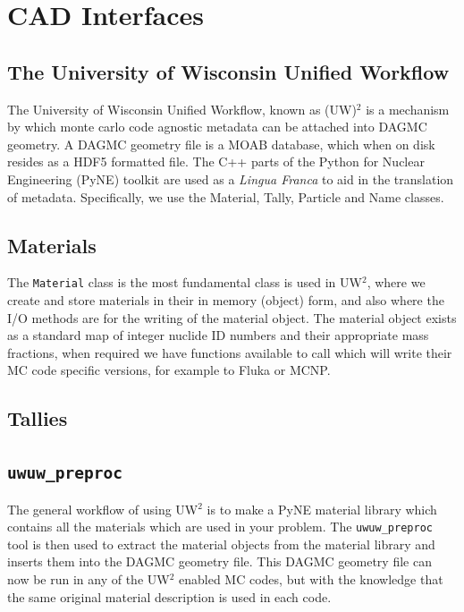 \clearpage
\section{CAD Interfaces}

\subsection{The University of Wisconsin Unified Workflow}
The University of Wisconsin Unified Workflow, known as (UW)$^2$ is a mechanism by which 
monte carlo code agnostic metadata can be attached into DAGMC geometry. A DAGMC geometry
file is a MOAB database, which when on disk resides as a HDF5 formatted file. The C++
parts of the Python for Nuclear Engineering (PyNE) toolkit are used as a \textit{Lingua Franca}
to aid in the translation of metadata. Specifically, we use the Material, Tally, Particle 
and Name classes.
\subsection{Materials}
The \texttt{Material} class is the most fundamental class is used in UW$^2$, where we create and store
materials in their in memory (object) form, and also where the I/O methods are for the writing 
of the material object. The material object exists as a standard map of integer nuclide ID numbers
and their appropriate mass fractions, when required we have functions available to call which will
write their MC code specific versions, for example to Fluka or MCNP. 
\subsection{Tallies}
\subsection{\texttt{uwuw\_preproc}}
The general workflow of using UW$^2$ is to make a PyNE material library which contains all the materials
which are used in your problem. The \texttt{uwuw\_preproc} tool is then used to extract the material 
objects from the material library and inserts them into the DAGMC geometry file. This DAGMC geometry
file can now be run in any of the UW$^2$ enabled MC codes, but with the knowledge that the same original
material description is used in each code. 
